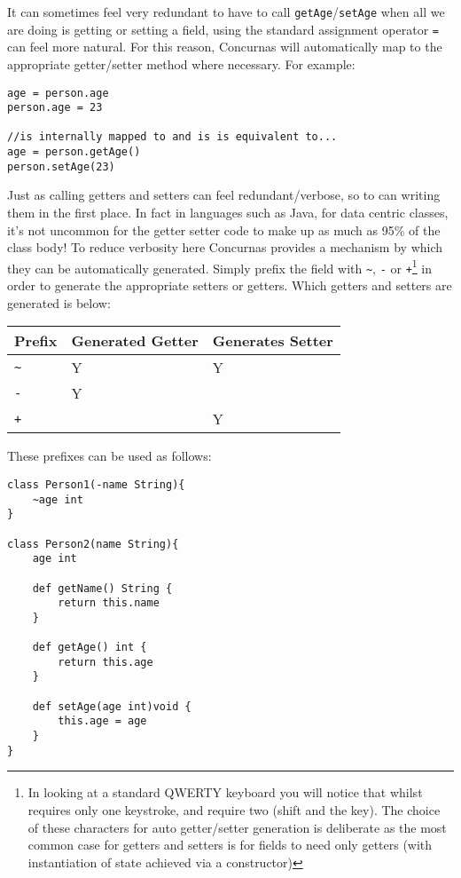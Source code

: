 \documentclass[conc-doc]{subfiles}
\begin{document}
It can sometimes feel very redundant to have to call \lstinline{getAge}/\lstinline{setAge} when all we are doing is getting or setting a field, using the standard assignment operator \lstinline{=} can feel more natural. For this reason, Concurnas will automatically map to the appropriate getter/setter method where necessary. For example:

\begin{lstlisting}
age = person.age
person.age = 23

//is internally mapped to and is is equivalent to...
age = person.getAge()
person.setAge(23)
\end{lstlisting}

Just as calling getters and setters can feel redundant/verbose, so to can writing them in the first place. In fact in languages such as Java, for data centric classes, it's not uncommon for the getter setter code to make up as much as 95\% of the class body! To reduce verbosity here Concurnas provides a mechanism by which they can be automatically generated. Simply prefix the field with \lstinline{~}, \lstinline{-} or \lstinline{+}\footnote{In looking at a standard QWERTY keyboard you will notice that whilst \scantokens{\lstinline{-}} requires only one keystroke, \scantokens{\lstinline{~}} and \scantokens{\lstinline{+}} require two (shift and the \scantokens{\lstinline{+/~}} key). The choice of these characters for auto getter/setter generation is deliberate as the most common case for getters and setters is for fields to need only getters (with instantiation of state achieved via a constructor)} in order to generate the appropriate setters or getters. Which getters and setters are generated is below:

\begin{table}[H]
	\centering
	\begin{tabular}{lll}
		\hline
		Prefix&Generated Getter&Generates Setter\\
		\hline
		\lstinline!~!&Y&Y\\
		\lstinline!-!&Y&\\
		\lstinline!+!&&Y\\
		\hline
	\end{tabular}%
\end{table}


These prefixes can be used as follows:

\begin{lstlisting}
class Person1(-name String){
	~age int
}

class Person2(name String){
	age int
	
	def getName() String {
		return this.name
	} 
	
	def getAge() int {
		return this.age
	}
	
	def setAge(age int)void {
		this.age = age
	}
}
\end{lstlisting}
\end{document}
